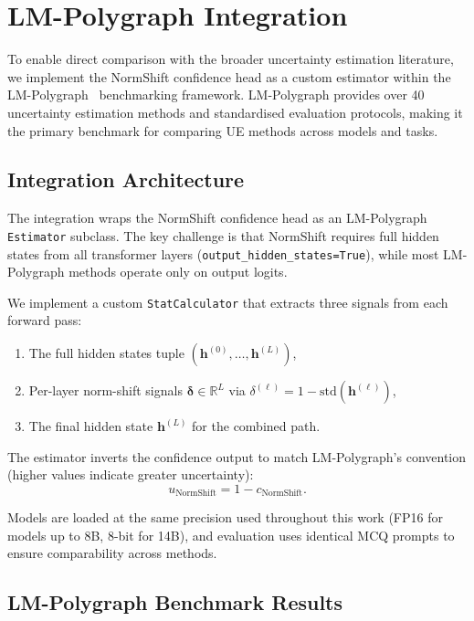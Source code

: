 \documentclass[11pt,a4paper]{article}
\newcommand{\R}{\mathbb{R}}
\begin{document}
\section{LM-Polygraph Integration}
\label{sec:polygraph}

To enable direct comparison with the broader uncertainty estimation
literature, we implement the NormShift confidence head as a custom
estimator within the
LM-Polygraph~\cite{fadeeva2024lmpolygraph} benchmarking framework.
LM-Polygraph provides over 40 uncertainty estimation methods and
standardised evaluation protocols, making it the primary benchmark
for comparing UE methods across models and tasks.

\subsection{Integration Architecture}

The integration wraps the NormShift confidence head as an LM-Polygraph
\texttt{Estimator} subclass.  The key challenge is that NormShift
requires full hidden states from all transformer layers
(\texttt{output\_hidden\_states=True}), while most LM-Polygraph methods
operate only on output logits.

We implement a custom \texttt{StatCalculator} that extracts three
signals from each forward pass:
\begin{enumerate}[nosep]
  \item The full hidden states tuple
        $({\mathbf{h}^{(0)}, \ldots, \mathbf{h}^{(L)}})$,
  \item Per-layer norm-shift signals
        $\boldsymbol{\delta} \in \R^{L}$ via
        $\delta^{(\ell)} = 1 - \text{std}(\mathbf{h}^{(\ell)})$,
  \item The final hidden state $\mathbf{h}^{(L)}$ for the combined path.
\end{enumerate}

The estimator inverts the confidence output to match LM-Polygraph's
convention (higher values indicate greater uncertainty):
\begin{equation}
  u_{\text{NormShift}} = 1 - c_{\text{NormShift}}.
\end{equation}

Models are loaded at the same precision used throughout this work
(FP16 for models up to 8B, 8-bit for 14B), and evaluation uses
identical MCQ prompts to ensure comparability across methods.

\subsection{LM-Polygraph Benchmark Results}
\end{document}
